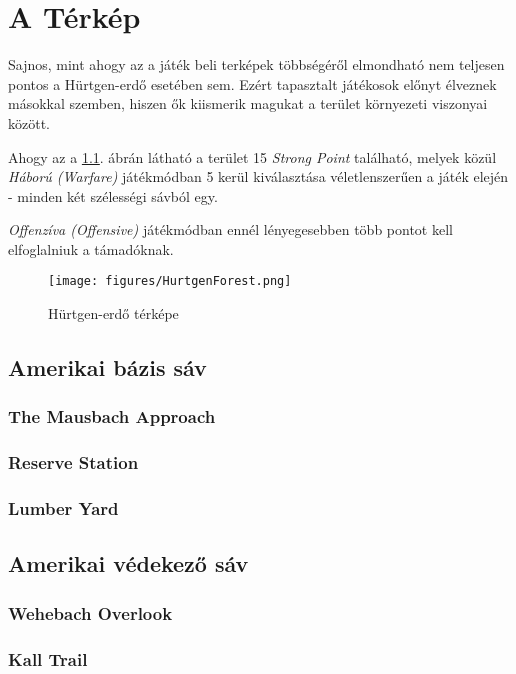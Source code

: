 \chapter{A Térkép}
Sajnos, mint ahogy az a játék beli terképek többségéről elmondható nem teljesen pontos a Hürtgen-erdő esetében sem. Ezért tapasztalt játékosok előnyt élveznek másokkal szemben, hiszen ők kiismerik magukat a terület környezeti viszonyai között.

Ahogy az a \ref{fig:hurtgenMap}. ábrán látható a terület 15 \emph{Strong Point} található, melyek közül \emph{Háború (Warfare)} játékmódban 5 kerül kiválasztása véletlenszerűen a játék elején - minden két szélességi sávból egy.

\emph{Offenzíva (Offensive)} játékmódban ennél lényegesebben több pontot kell elfoglalniuk a támadóknak.
\begin{figure}
    \centering
    \texttt{[image: figures/HurtgenForest.png]}
    \caption{Hürtgen-erdő térképe~\cite{WikiHurtgen}}
    \label{fig:hurtgenMap}
\end{figure}

\section{Amerikai bázis sáv}
\subsection{The Mausbach Approach}

\subsection{Reserve Station}

\subsection{Lumber Yard}

\section{Amerikai védekező sáv}
\subsection{Wehebach Overlook}

\subsection{Kall Trail}

